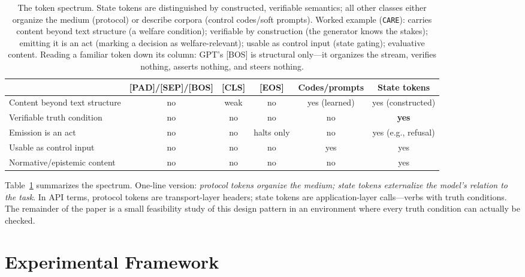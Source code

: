 \documentclass[11pt]{article}
\newcommand{\care}{\texttt{CARE}}
\begin{document}
\begin{table}[t]
\centering
\caption{The token spectrum. State tokens are distinguished by constructed, verifiable semantics; all other classes either organize the medium (protocol) or describe corpora (control codes/soft prompts). Worked example (\care): carries content beyond text structure (a welfare condition); verifiable by construction (the generator knows the stakes); emitting it is an act (marking a decision as welfare-relevant); usable as control input (state gating); evaluative content. Reading a familiar token down its column: GPT's [BOS] is structural only---it organizes the stream, verifies nothing, asserts nothing, and steers nothing.}
\label{tab:taxonomy}
\footnotesize
\setlength{\tabcolsep}{3pt}
\begin{tabular}{l c c c c c}
\toprule
 & [PAD]/[SEP]/[BOS] & [CLS] & [EOS] & Codes/prompts & State tokens \\
\midrule
Content beyond text structure & no & weak & no & yes (learned) & yes (constructed) \\
Verifiable truth condition & no & no & no & no & \textbf{yes} \\
Emission is an act & no & no & halts only & no & yes (e.g., refusal) \\
Usable as control input & no & no & no & yes & yes \\
Normative/epistemic content & no & no & no & no & yes \\
\bottomrule
\end{tabular}
\end{table}

Table~\ref{tab:taxonomy} summarizes the spectrum. One-line version: \emph{protocol tokens organize the medium; state tokens externalize the model's relation to the task}. In API terms, protocol tokens are transport-layer headers; state tokens are application-layer calls---verbs with truth conditions. The remainder of the paper is a small feasibility study of this design pattern in an environment where every truth condition can actually be checked.

\section{Experimental Framework}
\label{sec:framework}
\end{document}
